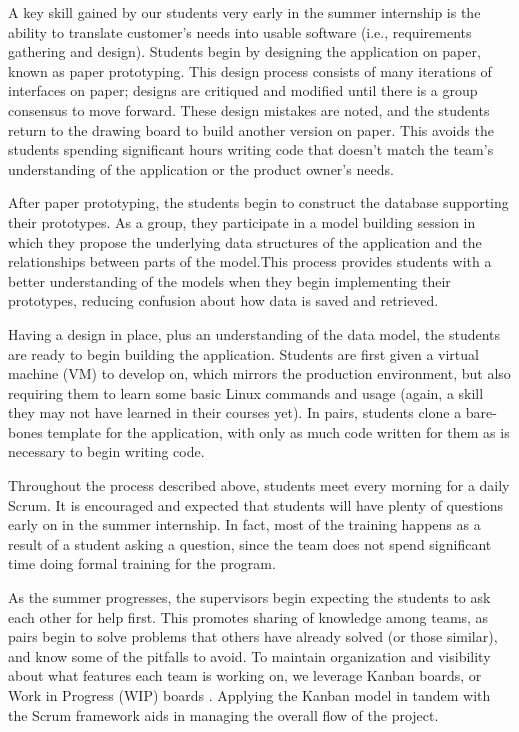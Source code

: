 A key skill gained by our students very early in the summer internship is the ability to translate customer's needs into usable software (i.e., requirements gathering and design). Students begin by designing the application on paper, known as paper prototyping. \cite{2003paperPrototype} This design process consists of many iterations of interfaces on paper; designs are critiqued and modified until there is a group consensus to move forward. These design mistakes are noted, and the students return to the drawing board to build another version on paper. This avoids the students spending significant hours writing code that doesn’t match the team’s understanding of the application or the product owner’s needs.

After paper prototyping, the students begin to construct the database supporting their prototypes. As a group, they participate in a model building session in which they propose the underlying data structures of the application and the relationships between parts of the model.This process provides students with a better
understanding of the models when they begin implementing their prototypes, reducing confusion about how data is saved and retrieved.

Having a design in place, plus an understanding of the data model, the students are ready to begin building the application. Students are first given a virtual machine (VM) to develop on, which mirrors the production environment, but also requiring them to learn some basic Linux commands and usage (again, a skill they may not have learned in their courses yet). In pairs, students clone a bare-bones template for the application, with only as much code written for them as is necessary to begin writing code.

Throughout the process described above, students meet every morning for a daily Scrum. It is encouraged and expected that students will have plenty of questions early on in the summer internship. In fact, most of the training happens as a result of a student asking a question, since the team does not spend significant time
doing formal training for the program.

As the summer progresses, the supervisors begin expecting the students to ask each other for help first. This promotes sharing of knowledge among teams, as pairs begin to solve problems that others have already solved (or those similar), and know some of the pitfalls to avoid. To maintain organization and visibility about what features each team is working on, we leverage Kanban boards, or Work in Progress (WIP) boards \cite{anderson2010kanban}. Applying the Kanban model in tandem with the Scrum framework aids in managing the overall flow of the project.

